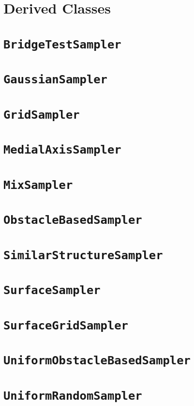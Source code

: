 \section{Derived Classes}

\section{\texttt{BridgeTestSampler}}

\section{\texttt{GaussianSampler}}

\section{\texttt{GridSampler}}

\section{\texttt{MedialAxisSampler}}

\section{\texttt{MixSampler}}

\section{\texttt{ObstacleBasedSampler}}

\section{\texttt{SimilarStructureSampler}}

\section{\texttt{SurfaceSampler}}

\section{\texttt{SurfaceGridSampler}}

\section{\texttt{UniformObstacleBasedSampler}}

\section{\texttt{UniformRandomSampler}}


